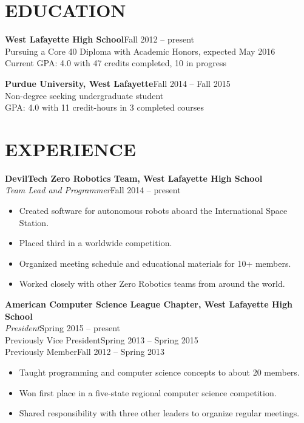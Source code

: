 \documentclass[line,margin]{res}
\begin{document}
\begin{resume}

\section{EDUCATION}
        {\bf\rmfamily West Lafayette High School}\hfill Fall 2012 -- present\\
        Pursuing a Core 40 Diploma with Academic Honors, expected May 2016\\
        Current GPA: 4.0 with 47 credits completed, 10 in progress

        {\bf\rmfamily Purdue University, West Lafayette}\hfill Fall 2014 -- Fall 2015\\
        Non-degree seeking undergraduate student\\
        GPA: 4.0 with 11 credit-hours in 3 completed courses


\section{EXPERIENCE}
        {\bf\rmfamily DevilTech Zero Robotics Team, West Lafayette High School}\\
        \emph{Team Lead and Programmer}\hfill Fall 2014 -- present
        \begin{itemize}  \itemsep -2pt %
        \item Created software for autonomous robots aboard the International Space Station.
        \item Placed third in a worldwide competition.
        \item Organized meeting schedule and educational materials for 10+ members.
        \item Worked closely with other Zero Robotics teams from around the world.
        \end{itemize}

        {\bf\rmfamily American Computer Science League Chapter, West Lafayette High School}\\
        \emph{President}\hfill Spring 2015 -- present\\
        Previously Vice President\hfill Spring 2013 -- Spring 2015\\
        Previously Member\hfill Fall 2012 -- Spring 2013
        \begin{itemize}  \itemsep -2pt %
        \item Taught programming and computer science concepts to about 20 members.
        \item Won first place in a five-state regional computer science competition.
        \item Shared responsibility with three other leaders to organize regular meetings.
        \end{itemize}


\end{resume}
\end{document}
